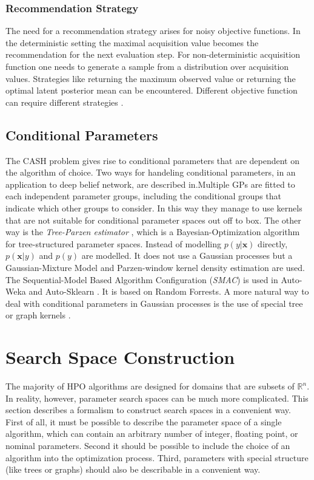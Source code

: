 \documentclass[english]{article}
\newcommand{\x}{\mathbf{x}}
\begin{document}
\subsubsection*{Recommendation Strategy}
The need for a recommendation strategy arises for noisy objective functions. In the deterministic setting the maximal acquisition value becomes the recommendation for the next evaluation step. For non-deterministic acquisition function one needs to generate a sample from a distribution over acquisition values. Strategies like returning the maximum observed value or returning the optimal latent posterior mean can be encountered. Different objective function can require different strategies \cite{hoffman_modular_2014}.

\subsection{Conditional Parameters}
The CASH problem gives rise to conditional parameters that are dependent on the algorithm of choice.
Two ways for handeling conditional parameters, in an application to deep belief network, are described in\cite{bergstra_algorithms_2011}.Multiple GPs are fitted to each independent parameter groups, including the conditional groups that indicate which other groups to consider. In this way they manage to use kernels that are not suitable for conditional parameter spaces out off to box.
The other way is the \textit{Tree-Parzen estimator} \cite{bergstra_algorithms_2011}, which is a Bayesian-Optimization algorithm for tree-structured parameter spaces. Instead of modelling $p(y|\x)$ directly, $p(\x|y)$ and $p(y)$ are modelled. It does not use a Gaussian processes but a Gaussian-Mixture Model and Parzen-window kernel density estimation are used.
The Sequential-Model Based Algorithm Configuration (\textit{SMAC}) \cite{hutter_sequential_2011} is used in Auto-Weka \cite{thornton_auto-weka:_2013} and Auto-Sklearn \cite{feurer_efficient_2015}. It is based on Random Forrests.
A more natural way to deal with conditional parameters in Gaussian processes is the use of special tree or graph kernels \cite{swersky_raiders_2014, chandar_hierarchical_2016}.


\section{Search Space Construction}
\label{construction}
The majority of HPO algorithms are designed for domains that are subsets of $\mathbb{R}^n$. In reality, however, parameter search spaces can be much more complicated. This section describes a formalism to construct search spaces in a convenient way. First of all, it must be possible to describe the parameter space of a single algorithm, which can contain an arbitrary number of integer, floating point, or nominal parameters. Second it should be possible to include the choice of an algorithm into the optimization process. Third, parameters with special structure (like trees or graphs) should also be describable in a convenient way.
\end{document}
